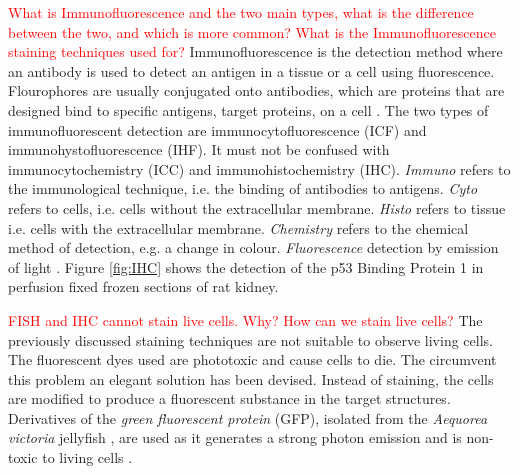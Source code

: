 \begin{definition}[Immunostaining]
	\textcolor{red}{What is Immunofluorescence and the two main types, what is the difference between the two, and which is more common? What is the Immunofluorescence staining techniques used for?}
	Immunofluorescence is the detection method where an antibody is used to detect an antigen in a tissue or a cell using fluorescence. Flourophores are usually conjugated onto antibodies, which are proteins that are designed bind to specific antigens, target proteins, on a cell \citep{CudeBurke2014}.
	The two types of immunofluorescent detection are immunocytofluorescence (ICF) and immunohystofluorescence (IHF).
	It must not be confused with immunocytochemistry (ICC) and immunohistochemistry (IHC).
	\textit{Immuno} refers to the immunological technique, i.e. the binding of antibodies to antigens.
	\textit{Cyto} refers to cells, i.e. cells without the extracellular membrane.
	\textit{Histo} refers to tissue i.e. cells with the extracellular membrane.
	\textit{Chemistry} refers to the chemical method of detection, e.g. a change in colour.
	\textit{Fluorescence} detection by emission of light \citep{Katikireddy2011}.
	Figure \ref{fig:IHC} shows the detection of the p53 Binding Protein 1 in perfusion fixed frozen sections of rat kidney.
\end{definition}

\begin{definition}
	\textcolor{red}{FISH and IHC cannot stain live cells. Why? How can we stain live cells?}
	The previously discussed staining techniques are not suitable to observe living cells.
	The fluorescent dyes used are phototoxic and cause cells to die. The circumvent this problem an elegant solution has been devised.
	Instead of staining, the cells are modified to produce a fluorescent substance in the target structures.
	Derivatives of the \textit{green fluorescent protein} (GFP), isolated from the \textit{Aequorea victoria} jellyfish \citep{Tsien1998,LichtmanConchello2005,Fatima2008}, are used as it generates a strong photon emission and is non-toxic to living cells \citep{Danek2012,Hubeny2008,Dobrucki2013}.
\end{definition}




